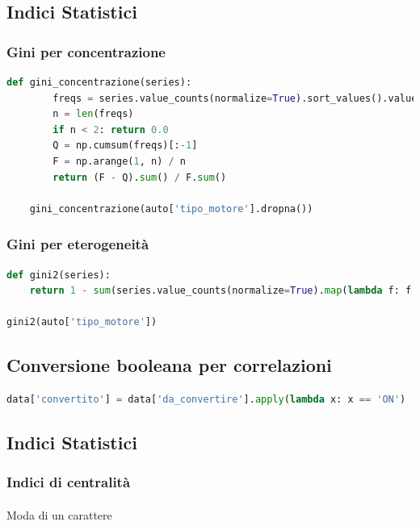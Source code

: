 \documentclass{article}
\begin{document}
\subsection*{Indici Statistici}

\subsubsection*{Gini per concentrazione}
\begin{lstlisting}[language=Python]
    def gini_concentrazione(series):
        freqs = series.value_counts(normalize=True).sort_values().values
        n = len(freqs)
        if n < 2: return 0.0
        Q = np.cumsum(freqs)[:-1]
        F = np.arange(1, n) / n
        return (F - Q).sum() / F.sum()

    gini_concentrazione(auto['tipo_motore'].dropna())
\end{lstlisting}

\subsubsection*{Gini per eterogeneità}
\begin{lstlisting}[language=Python]
def gini2(series):
    return 1 - sum(series.value_counts(normalize=True).map(lambda f: f ** 2))

gini2(auto['tipo_motore'])
\end{lstlisting}

\subsection*{Conversione booleana per correlazioni}

\begin{lstlisting}[language=Python]
data['convertito'] = data['da_convertire'].apply(lambda x: x == 'ON')
\end{lstlisting}

\subsection*{Indici Statistici}

\subsubsection*{Indici di centralità}

\paragraph{}{Moda di un carattere}
\end{document}
